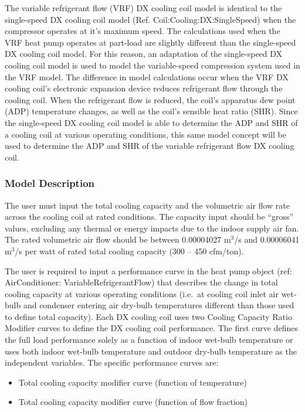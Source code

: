 The variable refrigerant flow (VRF) DX cooling coil model is identical to the single-speed DX cooling coil model (Ref. Coil:Cooling:DX:SingleSpeed) when the compressor operates at it's maximum speed. The calculations used when the VRF heat pump operates at part-load are slightly different than the single-speed DX cooling coil model. For this reason, an adaptation of the single-speed DX cooling coil model is used to model the variable-speed compression system used in the VRF model. The difference in model calculations occur when the VRF DX cooling coil's electronic expansion device reduces refrigerant flow through the cooling coil. When the refrigerant flow is reduced, the coil's apparatus dew point (ADP) temperature changes, as well as the coil's sensible heat ratio (SHR). Since the single-speed DX cooling coil model is able to determine the ADP and SHR of a cooling coil at various operating conditions, this same model concept will be used to determine the ADP and SHR of the variable refrigerant flow DX cooling coil.

\subsubsection{Model Description}\label{model-description-9}

The user must input the total cooling capacity and the volumetric air flow rate across the cooling coil at rated conditions. The capacity input should be ``gross'' values, excluding any thermal or energy impacts due to the indoor supply air fan. The rated volumetric air flow should be between 0.00004027 m\(^{3}\)/s and 0.00006041 m\(^{3}\)/s per watt of rated total cooling capacity (300 -- 450 cfm/ton).

The user is required to input a performance curve in the heat pump object (ref: AirConditioner: VariableRefrigerantFlow) that describes the change in total cooling capacity at various operating conditions (i.e.~at cooling coil inlet air wet-bulb and condenser entering air dry-bulb temperatures different than those used to define total capacity). Each DX cooling coil uses two Cooling Capacity Ratio Modifier curves to define the DX cooling coil performance. The first curve defines the full load performance solely as a function of indoor wet-bulb temperature or uses both indoor wet-bulb temperature and outdoor dry-bulb temperature as the independent variables. The specific performance curves are:

\begin{itemize}
\item Total cooling capacity modifier curve (function of temperature)
\item Total cooling capacity modifier curve (function of flow fraction)

\end{itemize}

